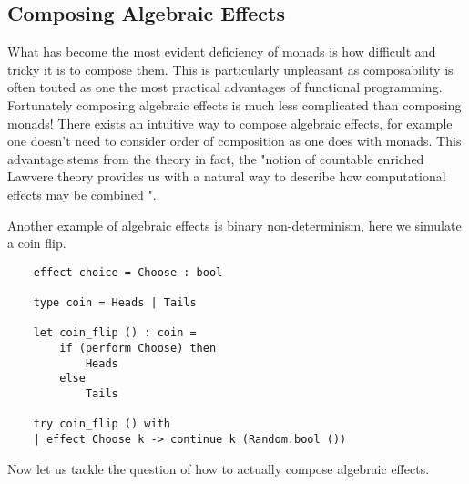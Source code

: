 \subsection{Composing Algebraic Effects}
What has become the most evident deficiency of monads is
how difficult and tricky it is to compose them.
This is particularly unpleasant as
composability is often touted as one the most practical advantages of functional programming.
Fortunately composing algebraic effects is much less complicated than composing monads!
There exists an intuitive way to compose algebraic effects,
for example one doesn't need to consider order of composition as one does with monads.
This advantage stems from the theory in fact,
the "notion of countable enriched Lawvere theory
provides us with a natural way to describe
how computational effects may be combined
"\cite{plotkin2004computational}.\\

\begin{example}
Another example of algebraic effects is binary non-determinism,
here we simulate a coin flip.
\begin{verbatim}
    effect choice = Choose : bool

    type coin = Heads | Tails

    let coin_flip () : coin =
        if (perform Choose) then
            Heads
        else
            Tails

    try coin_flip () with
    | effect Choose k -> continue k (Random.bool ())
    \end{verbatim}
\end{example}
Now let us tackle the question of how to actually compose
algebraic effects.\\

